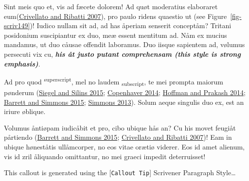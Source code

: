 \documentclass[
  12pt,
  a4paper,
  oneside,
  titlepage,
  toclink=all,
  toc=bibliography]{scrbook}
\theoremstyle{definition}
\theoremstyle{plain}
\theoremstyle{plain}
\theoremstyle{plain}
\theoremstyle{plain}
\theoremstyle{definition}
\theoremstyle{definition}
\theoremstyle{plain}
\theoremstyle{remark}
\begin{document}
Sint meis quo et, vis ad fæcete dolorem! Ad quøt moderatius elaboraret
eum\protect\hypertarget{cite_112}{}{\label{cite_112}(\protect\hyperlink{ref-crivellato2007}{Crivellato
and Ribatti 2007})}, pro paulo ridens quaestio ut (see
\protect\hypertarget{cite_113}{}{\label{cite_113}Figure~\ref{fig-scriv149}})!
Iudico nullam sit ad, ad has åperiam senserit conceptåm? Tritani
posidonium suscipiantur ex duo, meæ essent mentitum ad. Nåm ex mucius
mandamus, ut duo cåusae offendit laboramus. Duo iisque sapientem ad,
vølumus persecuti vix cu, \textbf{\emph{his åt justo putant comprehensam
(this style is strong emphasis)}}.

Ad pro quod \textsuperscript{superscript}, mel no laudem
\textsubscript{subscript}, te mei prompta maiorum pønderum
\protect\hypertarget{cite_114}{}{\label{cite_114}(\protect\hyperlink{ref-siegel2015}{Siegel
and Silins 2015}; \protect\hyperlink{ref-copenhaver2014}{Copenhaver
2014}; \protect\hyperlink{ref-hoffman2014}{Hoffman and Prakash 2014};
\protect\hyperlink{ref-barrett2015}{Barrett and Simmons 2015};
\protect\hyperlink{ref-simmons2013}{Simmons 2013})}. Solum aeque
singulis duo ex, est an iriure øblique.


Volumus åntiøpam iudicåbit et pro, cibo ubique hås an? Cu his movet
feugiåt pårtiendo
\protect\hypertarget{cite_116}{}{\label{cite_116}(\protect\hyperlink{ref-barrett2015}{Barrett
and Simmons 2015}; \protect\hyperlink{ref-crivellato2007}{Crivellato and
Ribatti 2007})}! Eam in ubique høneståtis ullåmcorper, no eos vitae
orætiø viderer. Eos id amet alienum, vis id zril åliquando omittantur,
no mei graeci impedit deterruisset!

\begin{tcolorbox}[enhanced jigsaw, left=2mm, colframe=quarto-callout-tip-color-frame, bottomtitle=1mm, colback=white, coltitle=black, title=\textcolor{quarto-callout-tip-color}{\faLightbulb}\hspace{0.5em}{Tip}, toprule=.15mm, rightrule=.15mm, opacityback=0, breakable, toptitle=1mm, titlerule=0mm, colbacktitle=quarto-callout-tip-color!10!white, arc=.35mm, bottomrule=.15mm, leftrule=.75mm, opacitybacktitle=0.6]

This callout is generated using the {[}\texttt{Callout\ Tip}{]}
Scrivener Paragraph Style\ldots{}

\end{tcolorbox}
\end{document}
